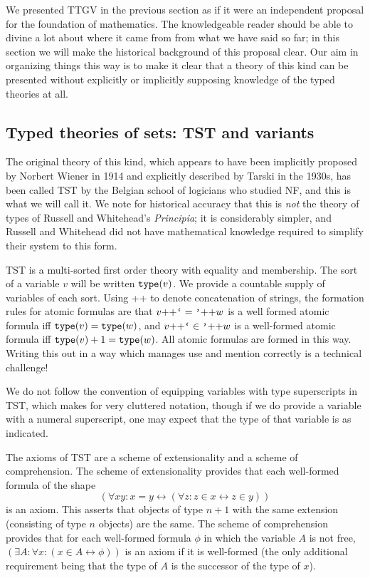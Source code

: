 \documentclass[12pt]{article}
\begin{document}
We presented TTGV in the previous section as if it were an independent proposal for the foundation of mathematics.  The knowledgeable reader should be able to divine a lot about where it came from from what we have said so far;  in this section we will make the historical background of this proposal clear.  Our aim in organizing things this way is to make it clear that a theory of this kind can be presented without explicitly or implicitly supposing knowledge of the typed theories at all.  

\subsection{Typed theories of sets:  TST and variants}

The original theory of this kind, which appears to have been implicitly proposed by Norbert Wiener in 1914 and explicitly described by Tarski in the 1930s, has been called TST by the Belgian school of logicians who studied NF, and this is what we will call it.  We note for historical accuracy that this is {\em not\/} the theory of types of Russell and Whitehead's {\em Principia\/};  it is considerably simpler, and Russell and Whitehead did not have mathematical knowledge required to simplify their system to this form.

TST is a multi-sorted first order theory with equality and membership.  The sort of a variable $v$ will be written ${\tt type}(v)$.  We provide a countable supply of variables of each sort.  Using ++ to denote concatenation of strings, the formation rules for atomic formulas are that $v{\tt ++}\verb|`|=\verb|'|{\tt ++}w$ is a well formed atomic formula iff ${\tt type}(v)={\tt type}(w)$, and 
$v{\tt ++}\verb|`|\in\verb|'|{\tt ++}w$ is a well-formed atomic formula iff ${\tt type}(v)+1 ={\tt type}(w)$.  All atomic formulas are formed in this way.  Writing this out in a way which manages use and mention correctly is a technical challenge!

We do not follow the convention of equipping variables with type superscripts in TST, which makes for very cluttered notation, though if we do provide a variable with a numeral superscript, one may expect that the type of that variable is as indicated.

The axioms of TST are a scheme of extensionality and a scheme of comprehension.  The scheme of extensionality provides that each well-formed formula of the shape $$(\forall xy:x=y \leftrightarrow (\forall z:z\in x \leftrightarrow z \in y))$$ is an axiom.  This asserts that objects of type $n+1$ with the same extension (consisting of type $n$ objects) are the same.  The scheme of comprehension provides that for each well-formed formula $\phi$ in which the variable $A$ is not free, 
$(\exists A:\forall x:(x \in A \leftrightarrow \phi))$ is an axiom if it is well-formed (the only additional requirement being that the type of $A$ is the successor of the type of $x$).
\end{document}
